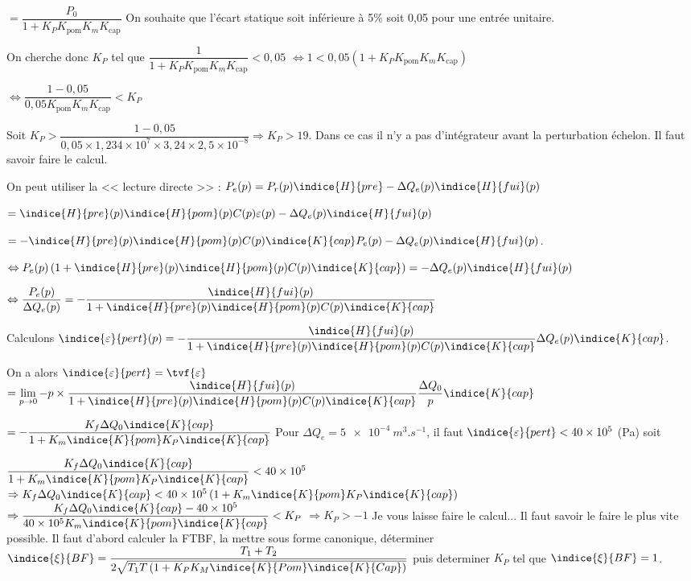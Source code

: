 \begin{corrigebox}
$= 
\dfrac{P_0}{1+K_P K_{\text{pom}} K_m K_{\text{cap}}}$
On souhaite que l'écart statique soit inférieure à 5\% soit 0,05 pour une entrée unitaire. 

On cherche donc $K_P$ tel que 
$\dfrac{1}{1+K_P K_{\text{pom}} K_m K_{\text{cap}}}<0,05 $
$ \Leftrightarrow 1<0,05\left(1+K_P K_{\text{pom}} K_m K_{\text{cap}}\right)$

$ \Leftrightarrow \dfrac{1 - 0,05}{0,05 K_{\text{pom}} K_m K_{\text{cap}}}<K_P $

Soit $ K_P > \dfrac{1 - 0,05}{0,05 \times 1,234 \times 10^7\times 3,24 \times  2,5 \times 10^{-8}}  \Rightarrow K_P > 19$.
Dans ce cas il n'y a pas d'intégrateur avant la perturbation échelon. Il faut savoir faire le calcul.

On peut utiliser la << lecture directe >> :
$P_e(p)= P_r(p)\indice{H}{pre} - \Delta Q_e(p) \indice{H}{fui}(p)$

$= \indice{H}{pre}(p)\indice{H}{pom}(p) C(p) \varepsilon(p)- \Delta Q_e(p) \indice{H}{fui}(p)$

$= -\indice{H}{pre}(p)\indice{H}{pom}(p) C(p) \indice{K}{cap} P_e(p)- \Delta Q_e(p) \indice{H}{fui}(p)$.

$\Leftrightarrow P_e(p) \left(1+\indice{H}{pre}(p)\indice{H}{pom}(p) C(p) \indice{K}{cap} \right)
=- \Delta Q_e(p) \indice{H}{fui}(p)$

$\Leftrightarrow \dfrac{P_e(p)}{\Delta Q_e(p)} 
=-  \dfrac{\indice{H}{fui}(p)}{1+\indice{H}{pre}(p)\indice{H}{pom}(p) C(p) \indice{K}{cap}}$

Calculons $\indice{\varepsilon}{pert}(p) = -  \dfrac{\indice{H}{fui}(p)}{1+\indice{H}{pre}(p)\indice{H}{pom}(p) C(p) \indice{K}{cap}} \Delta Q_e(p) \indice{K}{cap}$.

On a alors $\indice{\varepsilon}{pert}= \tvf{\varepsilon}$ 
$= \lim\limits_{p\to 0} - p\times  \dfrac{\indice{H}{fui}(p)}{1+\indice{H}{pre}(p)\indice{H}{pom}(p) C(p) \indice{K}{cap}} \dfrac{\Delta Q_0}{p} \indice{K}{cap}$

$= - \dfrac{K_f\Delta Q_0 \indice{K}{cap}}{1+K_m\indice{K}{pom} K_P \indice{K}{cap}} $
Pour $\Delta Q_e = \SI{5e-4}{m^3.s^{-1}}$, il faut $\indice{\varepsilon}{pert}<40\times 10^5$ (Pa) soit

$\dfrac{K_f\Delta Q_0 \indice{K}{cap} }{1+K_m\indice{K}{pom} K_P \indice{K}{cap}}  < 40\times 10^5$
$\Rightarrow  K_f\Delta Q_0 \indice{K}{cap}  < 40\times 10^5\left(1+K_m\indice{K}{pom} K_P \indice{K}{cap}\right)$
$\Rightarrow \dfrac{K_f\Delta Q_0 \indice{K}{cap}  -40\times 10^5}{40\times 10^5 K_m\indice{K}{pom} \indice{K}{cap} }< K_P $
$\Rightarrow K_P > -1$
Je vous laisse faire le calcul... Il faut savoir le faire le plus vite possible.
Il faut d'abord calculer la FTBF, la mettre sous forme canonique, déterminer 
$\indice{\xi}{BF}=\dfrac{T_1+T_2}{2\sqrt{T_1T\left( 1+K_P K_M \indice{K}{Pom}\indice{K}{Cap}\right)}}$ puis
determiner $K_P$ tel que $\indice{\xi}{BF}=1$.


\end{corrigebox}
